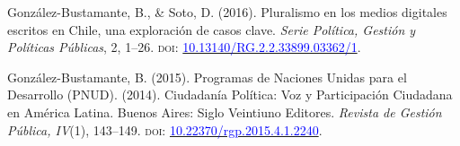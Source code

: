 \begin{publications}
\begin{benumerate}{4}
\item{González-Bustamante, B., \& Soto, D. (2016). Pluralismo en los medios digitales escritos en Chile, una exploración de casos clave. {\itshape Serie Política, Gestión y Políticas Públicas}, 2, 1--26. {\scshape doi:} \href{http://doi.org/10.13140/RG.2.2.33899.03362/1}{\textcolor{blue}{10.13140/RG.2.2.33899.03362/1}}.}\vspace{1mm}


\item{González-Bustamante, B. (2015). Programas de Naciones Unidas para el Desarrollo (PNUD). (2014). Ciudadanía Política: Voz y Participación Ciudadana en América Latina. Buenos Aires: Siglo Veintiuno Editores. {\itshape Revista de Gestión Pública, IV}(1), 143--149. {\scshape doi:} \href{https://doi.org/10.22370/rgp.2015.4.1.2240}{\textcolor{blue}{10.22370/rgp.2015.4.1.2240}}.}

\end{benumerate}

\end{publications}
